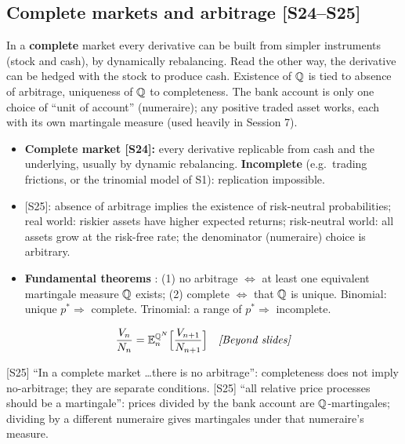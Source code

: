 \documentclass[10pt]{article}
\begin{document}
\subsection{Complete markets and arbitrage [S24--S25]}
\begin{idea}
In a \textbf{complete} market every derivative can be built from simpler instruments (stock and cash), by dynamically rebalancing. Read the other way, the derivative can be hedged with the stock to produce cash. Existence of $\mathbb{Q}$ is tied to absence of arbitrage, uniqueness of $\mathbb{Q}$ to completeness. The bank account is only one choice of ``unit of account'' (numeraire); any positive traded asset works, each with its own martingale measure (used heavily in Session 7).
\end{idea}
\begin{itemize}
\item \textbf{Complete market [S24]:} every derivative replicable from cash and the underlying, usually by dynamic rebalancing. \textbf{Incomplete} (e.g.\ trading frictions, or the trinomial model of S1): replication impossible.
\item {}[S25]: absence of arbitrage implies the existence of risk-neutral probabilities; real world: riskier assets have higher expected returns; risk-neutral world: all assets grow at the risk-free rate; the denominator (numeraire) choice is arbitrary.
\item \textbf{Fundamental theorems} \beyond: (1) no arbitrage $\iff$ at least one equivalent martingale measure $\mathbb{Q}$ exists; (2) complete $\iff$ that $\mathbb{Q}$ is unique. Binomial: unique $p^*\Rightarrow$ complete. Trinomial: a range of $p^*\Rightarrow$ incomplete.
\end{itemize}
\[\frac{V_n}{N_n}=\mathbb{E}^{\mathbb{Q}^N}_n\Big[\frac{V_{n+1}}{N_{n+1}}\Big]\quad\text{\textit{[Beyond slides]}}\]
\begin{where}
\end{where}
\begin{exam}
\flag{} [S25] ``In a complete market \ldots there is no arbitrage'': completeness does not imply no-arbitrage; they are separate conditions. \flag{} [S25] ``all relative price processes should be a martingale'': prices divided by the bank account are $\mathbb{Q}$-martingales; dividing by a different numeraire gives martingales under that numeraire's measure.
\end{exam}
\end{document}
